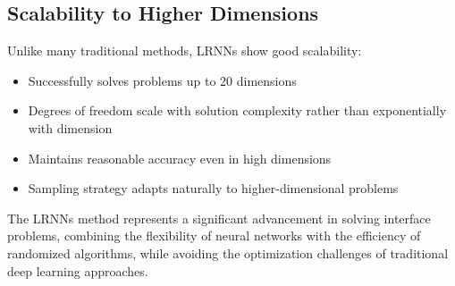 \documentclass[11pt]{article}
\begin{document}
\subsection{Scalability to Higher Dimensions}
Unlike many traditional methods, LRNNs show good scalability:
\begin{itemize}
    \item Successfully solves problems up to 20 dimensions
    \item Degrees of freedom scale with solution complexity rather than exponentially with dimension
    \item Maintains reasonable accuracy even in high dimensions
    \item Sampling strategy adapts naturally to higher-dimensional problems
\end{itemize}

The LRNNs method represents a significant advancement in solving interface problems, combining the flexibility of neural networks with the efficiency of randomized algorithms, while avoiding the optimization challenges of traditional deep learning approaches.
\end{document}
